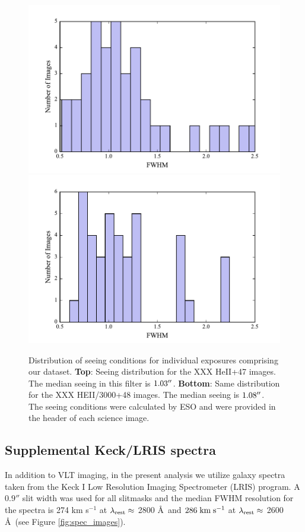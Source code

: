 \documentclass[twocolumn]{aastex6}
\def \mkms {{\rm \; km\;s^{-1}}}
\begin{document}
\begin{figure}[h]
\centering
\includegraphics[scale=.55]{../Figures/avg_seeing_HEII.pdf}
\includegraphics[scale=.55]{../Figures/avg_seeing_HEII3000.pdf}
\caption{  Distribution of seeing conditions for individual exposures comprising our dataset.
\textbf{Top}: Seeing distribution for the XXX HeII+47 images. The median seeing in this filter is $1.03\mbox{$^{\prime\prime}$}$.
\textbf{Bottom}: Same distribution for the XXX HEII/3000+48 images. The median seeing is $1.08\mbox{$^{\prime\prime}$}$. 
The seeing conditions were calculated by ESO and were provided in the header of each science image.
\label{fig.seeing}}
\end{figure}



\subsection{Supplemental Keck/LRIS spectra}
In addition to VLT imaging, in the present analysis we utilize galaxy spectra taken from the \cite{Rubin_2014} Keck I Low Resolution Imaging Spectrometer (LRIS) program. A $0.9''$ slit width was used for all slitmasks and the median FWHM resolution for the spectra is 274 km s$^{-1}$ at $\lambda_{\rm rest} \approx$ 2800 \AA\ and $286\mkms$  at $\lambda_{\rm rest}\approx$ 2600 \AA\ (see Figure \ref{fig:spec_images}).
\end{document}
